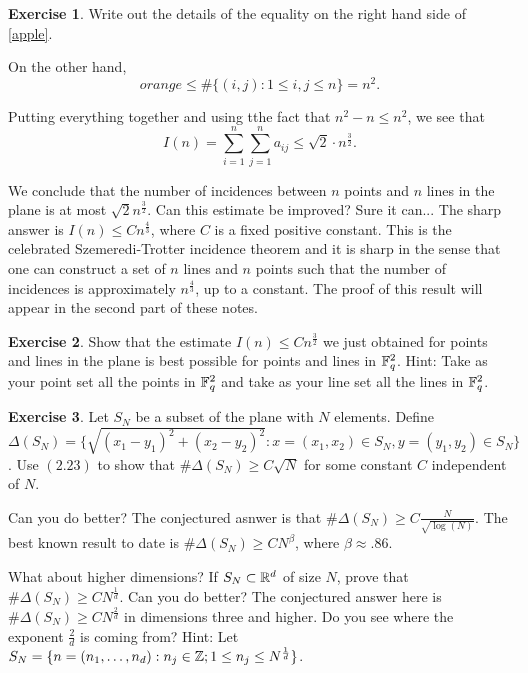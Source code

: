 \documentclass[]{amsart}
\numberwithin{equation}{section}
\theoremstyle{plain}
\theoremstyle{definition}
\newtheorem{exercise}{Exercise}[section]
\theoremstyle{remark}
\begin{document}
\begin{exercise} Write out the details of the equality on the
right hand side of \ref{apple}. \end{exercise}


On the other hand,
$$ orange \leq \# \{(i,j): 1 \leq i,j \leq n\}=n^2. $$

Putting everything together and using tthe fact that $n^2-n \leq n^2$, we
see that
$$ I(n)=\sum_{i=1}^n \sum_{j=1}^n a_{ij} \leq \sqrt{2} \cdot
n^{\frac{3}{2}}. $$

We conclude that the number of incidences between $n$ points and $n$
lines in the plane is at most $\sqrt{2}n^{\frac{3}{2}}$. Can this
estimate be improved? Sure it can... The sharp answer is $I(n) \leq
Cn^{\frac{4}{3}}$, where $C$ is a fixed positive constant. This is the
celebrated Szemeredi-Trotter incidence theorem and it is sharp in the
sense that one can construct a set of $n$ lines and $n$ points such that
the number of incidences is approximately $n^{\frac{4}{3}}$, up to a
constant. The proof of this result will appear in the second part of
these notes.

\begin{exercise} Show that the estimate $I(n) \leq
Cn^{\frac{3}{2}}$ we just obtained for points and lines in the plane is
best possible for points and lines in ${\Bbb F}_q^2$. Hint: Take as your
point set all the points in ${\Bbb F}_q^2$ and take as your line set all
the lines in ${\Bbb F}_q^2$. \end{exercise}

\begin{exercise} Let $S_N$ be a subset of the plane with $N$
elements. Define $\Delta(S_N)=\{\sqrt{{(x_1-y_1)}^2+{(x_2-y_2)}^2}:
x=(x_1,x_2) \in S_N, y=(y_1,y_2) \in S_N\}$. Use $(2.23)$ to show that
$\# \Delta(S_N) \ge C \sqrt{N}$ for some constant $C$ independent of $N$.

Can you do better? The conjectured asnwer is that $\# \Delta(S_N) \ge
C\frac{N}{\sqrt{\log(N)}}$. The best known result to date is $\#
\Delta(S_N) \ge CN^{\beta}$, where $\beta \approx .86$.

What about higher dimensions? If $S_N \subset {\Bbb R}^d$ of size $N$,
prove that $\# \Delta(S_N) \ge CN^{\frac{1}{d}}$. Can you do better? The
conjectured answer here is $\# \Delta(S_N) \ge CN^{\frac{2}{d}}$ in
dimensions three and higher. Do you see where the exponent $\frac{2}{d}$
is coming from? Hint: Let $S_N=\{n=(n_1, \dots, n_d): n_j \in {\Bbb Z}; 1
\leq n_j \leq N^{\frac{1}{d}} \}$. \end{exercise}
\end{document}
